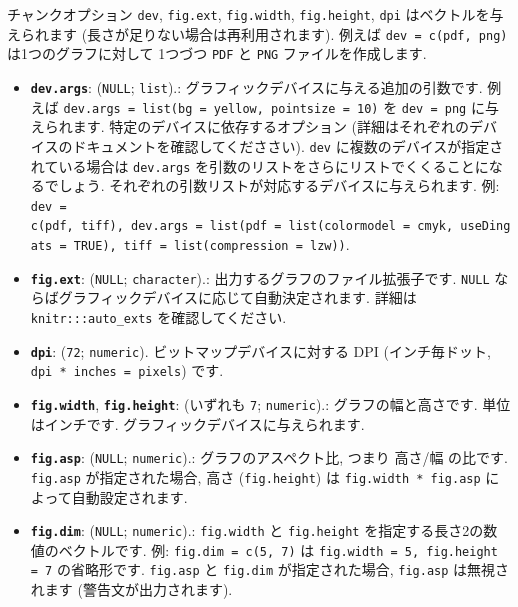 \documentclass[
  11pt,
  lualatex,ja=standard,jafont=noto]{bxjsreport}
\providecommand{\tightlist}{%
  \setlength{\itemsep}{0pt}\setlength{\parskip}{0pt}}
\begin{document}
チャンクオプション \texttt{dev}, \texttt{fig.ext}, \texttt{fig.width}, \texttt{fig.height}, \texttt{dpi} はベクトルを与えられます (長さが足りない場合は再利用されます). 例えば \texttt{dev = c(\textquotesingle{}pdf\textquotesingle{},\ \textquotesingle{}png\textquotesingle{})} は1つのグラフに対して 1つづつ \texttt{PDF} と \texttt{PNG} ファイルを作成します.

\begin{itemize}
\tightlist
\item
  \textbf{\texttt{dev.args}}: (\texttt{NULL}; \texttt{list}).: グラフィックデバイスに与える追加の引数です. 例えば \texttt{dev.args = list(bg = \textquotesingle{}yellow\textquotesingle{},\ pointsize\ =\ 10)} を \texttt{dev = \textquotesingle{}png\textquotesingle{}} に与えられます. 特定のデバイスに依存するオプション (詳細はそれぞれのデバイスのドキュメントを確認してくだささい). \texttt{dev} に複数のデバイスが指定されている場合は \texttt{dev.args} を引数のリストをさらにリストでくくることになるでしょう. それぞれの引数リストが対応するデバイスに与えられます. 例: \texttt{dev = c(\textquotesingle{}pdf\textquotesingle{},\ \textquotesingle{}tiff\textquotesingle{}),\ dev.args\ =\ list(pdf\ =\ list(colormodel\ =\ \textquotesingle{}cmyk\textquotesingle{},\ useDingats\ =\ TRUE),\ tiff\ =\ list(compression\ =\ \textquotesingle{}lzw\textquotesingle{}))}.
\item
  \textbf{\texttt{fig.ext}}: (\texttt{NULL}; \texttt{character}).: 出力するグラフのファイル拡張子です. \texttt{NULL} ならばグラフィックデバイスに応じて自動決定されます. 詳細は \texttt{knitr:::auto\_exts} を確認してください.
\item
  \textbf{\texttt{dpi}}: (\texttt{72}; \texttt{numeric}). ビットマップデバイスに対する DPI (インチ毎ドット, \texttt{dpi * inches = pixels}) です.
\item
  \textbf{\texttt{fig.width}}, \textbf{\texttt{fig.height}}: (いずれも \texttt{7}; \texttt{numeric}).: グラフの幅と高さです. 単位はインチです. グラフィックデバイスに与えられます.
\item
  \textbf{\texttt{fig.asp}}: (\texttt{NULL}; \texttt{numeric}).: グラフのアスペクト比, つまり 高さ/幅 の比です. \texttt{fig.asp} が指定された場合, 高さ (\texttt{fig.height}) は \texttt{fig.width * fig.asp} によって自動設定されます.
\item
  \textbf{\texttt{fig.dim}}: (\texttt{NULL}; \texttt{numeric}).: \texttt{fig.width} と \texttt{fig.height} を指定する長さ2の数値のベクトルです. 例: \texttt{fig.dim = c(5, 7)} は \texttt{fig.width = 5, fig.height = 7} の省略形です. \texttt{fig.asp} と \texttt{fig.dim} が指定された場合, \texttt{fig.asp} は無視されます (警告文が出力されます).

\end{itemize}
\end{document}
